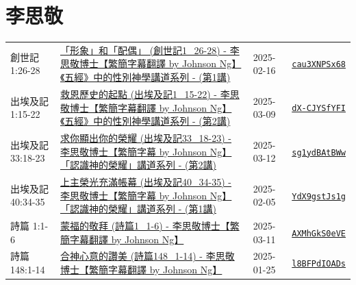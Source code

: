 \documentclass{book}
\begin{document}
\chapter{李思敬}\label{ch:preacher5}
\begin{multicols}{3}
\minitoc
\end{multicols}
{ \scriptsize


\begin{xltabular}{\textwidth}{|p{0.15\textwidth} p{0.6\textwidth}|p{0.07\textwidth} p{0.1\textwidth}|}
\hline
創世記 1:26-28 & \hyperref[sec:cau3XNPSx68]{「形象」和「配偶」 (創世記1\_26-28) - 李思敬博士【繁簡字幕翻譯 by Johnson Ng】《五經》中的性別神學講道系列 - (第1講)} & 2025-02-16 & \href{https://youtube.com/watch?v=cau3XNPSx68}{\texttt{cau3XNPSx68}} \\
出埃及記 1:15-22 & \hyperref[sec:dX_CJYSfYFI]{救恩歷史的起點 (出埃及記1\_15-22) - 李思敬博士【繁簡字幕翻譯 by Johnson Ng】《五經》中的性別神學講道系列 - (第2講)} & 2025-03-09 & \href{https://youtube.com/watch?v=dX-CJYSfYFI}{\texttt{dX-CJYSfYFI}} \\
出埃及記 33:18-23 & \hyperref[sec:sg1ydBAtBWw]{求你顯出你的榮耀 (出埃及記33\_18-23) - 李思敬博士【繁簡字幕 by Johnson Ng】「認識神的榮耀」講道系列 - (第2講)} & 2025-03-12 & \href{https://youtube.com/watch?v=sg1ydBAtBWw}{\texttt{sg1ydBAtBWw}} \\
出埃及記 40:34-35 & \hyperref[sec:YdX9gstJs1g]{上主榮光充滿帳幕 (出埃及記40\_34-35) - 李思敬博士【繁簡字幕 by Johnson Ng】「認識神的榮耀」講道系列 - (第1講)} & 2025-02-05 & \href{https://youtube.com/watch?v=YdX9gstJs1g}{\texttt{YdX9gstJs1g}} \\
詩篇 1:1-6 & \hyperref[sec:AXMhGkS0eVE]{蒙福的敬拜 (詩篇1\_1-6) - 李思敬博士【繁簡字幕翻譯 by Johnson Ng】} & 2025-03-11 & \href{https://youtube.com/watch?v=AXMhGkS0eVE}{\texttt{AXMhGkS0eVE}} \\
詩篇 148:1-14 & \hyperref[sec:l8BFPdIOADs]{合神心意的讚美 (詩篇148\_1-14) - 李思敬博士【繁簡字幕翻譯 by Johnson Ng】} & 2025-01-25 & \href{https://youtube.com/watch?v=l8BFPdIOADs}{\texttt{l8BFPdIOADs}} \\
\hline
\end{xltabular}
}
\newpage
\end{document}
